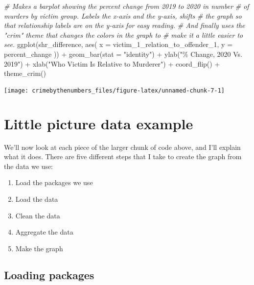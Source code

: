 \documentclass[
  a4paper,
]{krantz}
\makeatletter
\newenvironment{Shaded}{\begin{snugshade}}{\end{snugshade}}
\newcommand{\AttributeTok}[1]{\textcolor[rgb]{0.77,0.63,0.00}{#1}}
\newcommand{\CommentTok}[1]{\textcolor[rgb]{0.56,0.35,0.01}{\textit{#1}}}
\newcommand{\FunctionTok}[1]{\textcolor[rgb]{0.00,0.00,0.00}{#1}}
\newcommand{\NormalTok}[1]{#1}
\newcommand{\SpecialCharTok}[1]{\textcolor[rgb]{0.00,0.00,0.00}{#1}}
\newcommand{\StringTok}[1]{\textcolor[rgb]{0.31,0.60,0.02}{#1}}
\providecommand{\tightlist}{%
  \setlength{\itemsep}{0pt}\setlength{\parskip}{0pt}}
\newenvironment{kframe}{%
\medskip{}
\setlength{\fboxsep}{.8em}
 \def\at@end@of@kframe{}%
 \ifinner\ifhmode%
  \def\at@end@of@kframe{\end{minipage}}%
  \begin{minipage}{\columnwidth}%
 \fi\fi%
 \def\FrameCommand##1{\hskip\@totalleftmargin \hskip-\fboxsep
 \colorbox{shadecolor}{##1}\hskip-\fboxsep
     \hskip-\linewidth \hskip-\@totalleftmargin \hskip\columnwidth}%
 \MakeFramed {\advance\hsize-\width
   \@totalleftmargin\z@ \linewidth\hsize
   \@setminipage}}%
 {\par\unskip\endMakeFramed%
 \at@end@of@kframe}
\renewenvironment{Shaded}{\begin{kframe}}{\end{kframe}}
\makeatother
\begin{document}
\begin{Shaded}
\begin{Highlighting}[]
\CommentTok{\# Makes a barplot showing the percent change from 2019 to 2020 in number}
\CommentTok{\# of murders by victim group. Labels the x{-}axis and the y{-}axis, shifts}
\CommentTok{\# the graph so that relationship labels are on the y{-}axis for easy reading.}
\CommentTok{\# And finally uses the "crim" theme that changes the colors in the graph to}
\CommentTok{\# make it a little easier to see.}
\FunctionTok{ggplot}\NormalTok{(shr\_difference, }\FunctionTok{aes}\NormalTok{(}
  \AttributeTok{x =}\NormalTok{ victim\_1\_relation\_to\_offender\_1,}
  \AttributeTok{y =}\NormalTok{ percent\_change}
\NormalTok{)) }\SpecialCharTok{+}
  \FunctionTok{geom\_bar}\NormalTok{(}\AttributeTok{stat =} \StringTok{"identity"}\NormalTok{) }\SpecialCharTok{+}
  \FunctionTok{ylab}\NormalTok{(}\StringTok{"\% Change, 2020 Vs. 2019"}\NormalTok{) }\SpecialCharTok{+}
  \FunctionTok{xlab}\NormalTok{(}\StringTok{"Who Victim Is Relative to Murderer"}\NormalTok{) }\SpecialCharTok{+}
  \FunctionTok{coord\_flip}\NormalTok{() }\SpecialCharTok{+}
  \FunctionTok{theme\_crim}\NormalTok{()}
\end{Highlighting}
\end{Shaded}

\begin{center}\texttt{[image: crimebythenumbers\_files/figure-latex/unnamed-chunk-7-1]} \end{center}

\hypertarget{little-picture-data-example}{%
\section{Little picture data
example}\label{little-picture-data-example}}

We'll now look at each piece of the larger chunk of code
above, and I'll explain what it does. There are five
different steps that I take to create the graph from the
data we use:

\begin{enumerate}
\def\labelenumi{\arabic{enumi}.}
\tightlist
\item
  Load the packages we use
\item
  Load the data
\item
  Clean the data
\item
  Aggregate the data
\item
  Make the graph
\end{enumerate}

\hypertarget{loading-packages}{%
\subsection{Loading packages}\label{loading-packages}}
\end{document}
